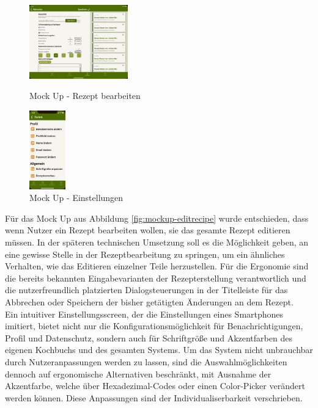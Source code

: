 \begin{figure}
    \centering
        \includegraphics[width=0.38\textwidth]{images/editrecipe.png}
    \caption[Mock Up - Rezept bearbeiten]{Mock Up - Rezept bearbeiten}
\label{fig:mockup-editrecipe}
    \centering
        \includegraphics[width=0.14\textwidth]{images/settings.jpg}
    \caption[Mock Up - Einstellungen]{Mock Up - Einstellungen}
\label{fig:mockup-settings}
\end{figure}
Für das Mock Up aus Abbildung \ref{fig:mockup-editrecipe} wurde entschieden, dass wenn Nutzer ein Rezept bearbeiten wollen, sie das gesamte Rezept editieren müssen. In der späteren technischen Umsetzung soll es die Möglichkeit geben, an eine gewisse Stelle in der Rezeptbearbeitung zu springen, um ein ähnliches Verhalten, wie das Editieren einzelner Teile herzustellen. Für die Ergonomie sind die bereits bekannten Eingabevarianten der Rezepterstellung verantwortlich und die nutzerfreundlich platzierten Dialogsteuerungen in der Titelleiste für das Abbrechen oder Speichern der bisher getätigten Änderungen an dem Rezept. \\

Ein intuitiver Einstellungsscreen, der die Einstellungen eines Smartphones imitiert, bietet nicht nur die Konfigurationsmöglichkeit für Benachrichtigungen, Profil und Datenschutz, sondern auch für Schriftgröße und Akzentfarben des eigenen Kochbuchs und des gesamten Systems. Um das System nicht unbrauchbar durch Nutzeranpassungen werden zu lassen, sind die Auswahlmöglichkeiten dennoch auf ergonomische Alternativen beschränkt, mit Ausnahme der Akzentfarbe, welche über Hexadezimal-Codes oder einen Color-Picker verändert werden können. Diese Anpassungen sind der Individualiserbarkeit verschrieben. \\
\\
\\

